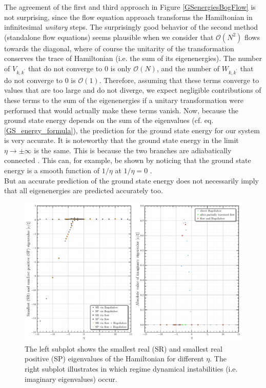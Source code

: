 The agreement of the first and third approach in Figure \ref{GSenergiesBogFlow} is not surprising, since the flow equation approach transforms the Hamiltonian in infinitesimal \emph{unitary} steps. The surprisingly good behavior of the second method (standalone flow equations) seems plausible when we consider that $\mathcal O(N^2)$ flows towards the diagonal, where of course the unitarity of the transformation conserves the trace of Hamiltonian (i.e. the sum of its eigenenergies). The number of $V_{k,k^\prime}$ that do not converge to 0 is only $\mathcal O(N)$, and the number of $W_{k,k^\prime}$ that do not converge to 0 is $\mathcal O(1)$. Therefore, assuming that these terms converge to values that are too large and do not diverge, we expect negligible contributions of these terms to the sum of the eigenenergies if a unitary transformation were performed that would actually make these terms vanish. Now, because the ground state energy depends on the sum of the eigenvalues (cf. eq. \ref{GS_energy_formula}), the prediction for the ground state energy for our system is very accurate. It is noteworthy that the ground state energy in the limit $\eta\rightarrow\pm\infty$ is the same. This is because the two branches are adiabatically connected \cite{Grusdt_2017,PhysRevA.98.033610}. This can, for example, be shown by noticing that the ground state energy is a smooth function of $1/\eta$ at $1/\eta=0$ \cite[Fig. 1]{PhysRevA.98.033610}.\\
But an accurate prediction of the ground state energy does not necessarily imply that all eigenenergies are predicted accurately too. 
\begin{figure}[H]
    \centering
    \includegraphics[width=\textwidth]{figures/plots/PDF/spectrum_analysis_bog_flow_comp.pdf}
    \caption[Characteristic eigenenergies of the Bose Polaron for different $\eta$]{The left subplot shows the smallest real (SR) and smallest real positive (SP) eigenvalues of the Hamiltonian for different $\eta$. The right subplot illustrates in which regime dynamical instabilities (i.e. imaginary eigenvalues) occur.
}
    \label{SpectrumAnalysis}
\end{figure}
